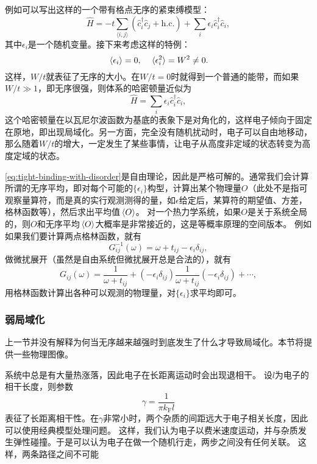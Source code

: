 \documentclass[hyperref, UTF8, a4paper]{ctexart}
\newcommand*{\pair}[1]{\langle #1 \rangle}
\begin{document}
例如可以写出这样的一个带有格点无序的紧束缚模型：
\begin{equation}
    \hat{H} = - t \sum_{\pair{i, j}} (\hat{c}_i^\dagger \hat{c}_j + \text{h.c.}) + \sum_i \epsilon_i \hat{c}_i^\dagger \hat{c}_i,
    \label{eq:tight-binding-with-disorder}
\end{equation}
其中$\epsilon_i$是一个随机变量。接下来考虑这样的特例：
\begin{equation}
    \expval*{\epsilon_i} = 0, \quad \expval*{\epsilon_i^2} = W^2 \neq 0.
\end{equation}
这样，$W/t$就表征了无序的大小。在$W/t=0$时就得到一个普通的能带，而如果$W/t \gg 1$，即无序很强，则体系的哈密顿量近似为
\[
    \hat{H} = \sum_i \epsilon_i \hat{c}_i^\dagger \hat{c}_i,
\]
这个哈密顿量在以瓦尼尔波函数为基底的表象下是对角化的，这样电子倾向于固定在原地，即出现局域化。另一方面，完全没有随机扰动时，电子可以自由地移动，那么随着$W/t$的增大，一定发生了某些事情，让电子从高度非定域的状态转变为高度定域的状态。

\eqref{eq:tight-binding-with-disorder}是自由理论，因此是严格可解的。通常我们会计算所谓的无序平均，即对每个可能的$\{\epsilon_i\}$构型，计算出某个物理量$O$（此处不是指可观察量算符，而是真的实行观测测得的量，如$\epsilon$给定后，某算符的期望值、方差，格林函数等），然后求出平均值$\expval*{O}$。
对一个热力学系统，如果$O$是关于系统全局的，则$O$和无序平均$\expval*{O}$大概率是非常接近的，这是等概率原理的空间版本。
例如如果我们要计算两点格林函数，就有
\[
    G^{-1}_{ij}(\omega) = \omega + t_{ij} - \epsilon_i \delta_{ij},
\]
做微扰展开（虽然是自由系统但微扰展开总是合法的），就有
\[
    G_{ij}(\omega) = \frac{1}{\omega + t_{ij}} + (- \epsilon_i \delta_{ij}) \frac{1}{\omega + t_{ij}} (- \epsilon_i \delta_{ij}) + \cdots,
\]
用格林函数计算出各种可以观测的物理量，对$\{\epsilon_i\}$求平均即可。

\subsubsection{弱局域化}

上一节并没有解释为何当无序越来越强时到底发生了什么才导致局域化。本节将提供一些物理图像。

系统中总是有大量热涨落，因此电子在长距离运动时会出现退相干。
设$l$为电子的相干长度，则参数
\begin{equation}
    \gamma = \frac{1}{\pi k_\text{F} l}
\end{equation}
表征了长距离相干性。在$\gamma$非常小时，两个杂质的间距远大于电子相关长度，因此可以使用经典模型处理问题。
这样，我们认为电子以费米速度运动，并与杂质发生弹性碰撞。于是可以认为电子在做一个随机行走，两步之间没有任何关联。
这样，两条路径之间不可能
\end{document}

